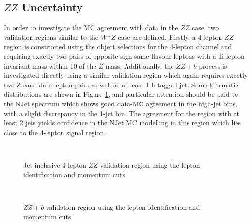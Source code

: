 \subsection{$ZZ$ Uncertainty}
In order to investigate the MC agreement with data in the $ZZ$ case, two validation regions similar to the $W^{\pm}Z$ case are defined. 
Firstly, a 4 lepton $ZZ$ region is constructed using the object selections for the 4-lepton channel and requiring exactly two pairs of 
opposite sign-same flavour leptons with a di-lepton invariant mass within 10 \gevcc of the $Z$ mass. Additionally, the $ZZ+b$ process 
is investigated directly using a similar validation region which again requires exactly two Z-candidate lepton pairs as well as at least 
1 b-tagged jet. Some kinematic distributions are shown in Figure \ref{fig:zz_incl}, and particular attention should be paid to the NJet spectrum 
which shows good data-MC agreement in the high-jet bins, with a slight discrepancy in the 1-jet bin. The agreement for the region with at least 
2 jets yields confidence in the NJet MC modelling in this region which lies close to the 4-lepton signal region. 

\begin{figure}[htbp]
        \centering
        \mbox{
        }\vspace*{-0.1cm}
        \mbox{
        }\vspace*{-0.1cm}
        \caption{Jet-inclusive 4-lepton $ZZ$ validation region using the \tth lepton identification and momentum cuts }
        \label{fig:zz_incl}
\end{figure}

\begin{figure}[htbp]
        \centering
        \mbox{
        }\vspace*{-0.1cm}
        \mbox{
        }\vspace*{-0.1cm}
        \caption{$ZZ+b$ validation region using the \tth lepton identification and momentum cuts }
        \label{fig:zz_z_b}
\end{figure}

